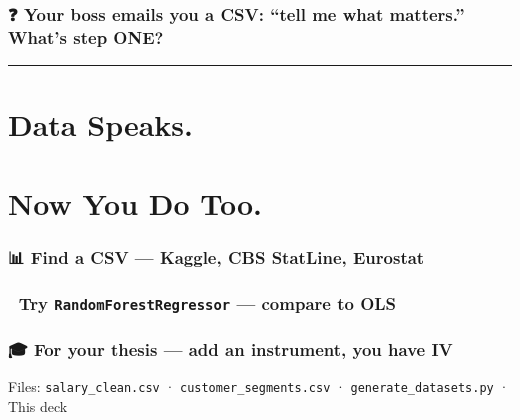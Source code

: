 \documentclass[
]{article}
\begin{document}
\subsubsection{❓ Your boss emails you a CSV: ``tell me what matters.''
What's step
ONE?}\label{your-boss-emails-you-a-csv-tell-me-what-matters.-whats-step-one}

\begin{center}\rule{0.5\linewidth}{0.5pt}\end{center}

\section{Data Speaks.}\label{data-speaks.-1}

\section{Now You Do Too.}\label{now-you-do-too.}

\subsubsection{📊 Find a CSV --- Kaggle, CBS StatLine,
Eurostat}\label{find-a-csv-kaggle-cbs-statline-eurostat}

\subsubsection{\texorpdfstring{🤖 Try \texttt{RandomForestRegressor} ---
compare to
OLS}{🤖 Try RandomForestRegressor --- compare to OLS}}\label{try-randomforestregressor-compare-to-ols}

\subsubsection{🎓 For your thesis --- add an instrument, you have
IV}\label{for-your-thesis-add-an-instrument-you-have-iv}

Files: \texttt{salary\_clean.csv} · \texttt{customer\_segments.csv} ·
\texttt{generate\_datasets.py} · This deck
\end{document}
